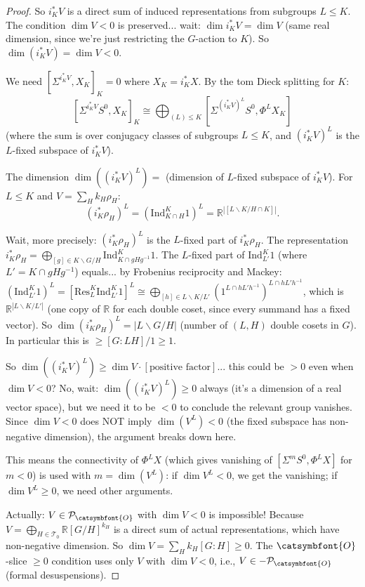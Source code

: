 \documentclass[12pt]{article}
\theoremstyle{definition}
\newcommand{\aO}{{\catsymbfont{O}}}
\begin{document}
\begin{proof}
So $i_K^* V$ is a direct sum of induced representations from subgroups $L\leq K$. The condition $\dim V < 0$ is preserved... wait: $\dim i_K^* V = \dim V$ (same real dimension, since we're just restricting the $G$-action to $K$). So $\dim(i_K^*V) = \dim V < 0$.

We need $[\Sigma^{i_K^*V}, X_K]_K = 0$ where $X_K = i_K^* X$. By the tom Dieck splitting for $K$:
$$[\Sigma^{i_K^*V} S^0, X_K]_K \cong \bigoplus_{(L)\leq K}[\Sigma^{(i_K^*V)^L}S^0, \Phi^L X_K]$$
(where the sum is over conjugacy classes of subgroups $L\leq K$, and $(i_K^*V)^L$ is the $L$-fixed subspace of $i_K^*V$).

The dimension $\dim((i_K^*V)^L) = $ (dimension of $L$-fixed subspace of $i_K^*V$). For $L\leq K$ and $V = \sum_H k_H \rho_H$:
$$(i_K^*\rho_H)^L = (\mathrm{Ind}_{K\cap H}^K 1)^L = \mathbb{R}^{|[L\backslash K/H\cap K]|}.$$

Wait, more precisely: $(i_K^*\rho_H)^L$ is the $L$-fixed part of $i_K^*\rho_H$. The representation $i_K^*\rho_H = \bigoplus_{[g]\in K\backslash G/H}\mathrm{Ind}_{K\cap gHg^{-1}}^K 1$. The $L$-fixed part of $\mathrm{Ind}_{L'}^K 1$ (where $L' = K\cap gHg^{-1}$) equals... by Frobenius reciprocity and Mackey: $(\mathrm{Ind}_{L'}^K 1)^L = [\mathrm{Res}_L^K\mathrm{Ind}_{L'}^K 1]^L \cong \bigoplus_{[h]\in L\backslash K/L'}(1^{L\cap hL'h^{-1}})^{L\cap hL'h^{-1}}$, which is $\mathbb{R}^{|L\backslash K/L'|}$ (one copy of $\mathbb{R}$ for each double coset, since every summand has a fixed vector). So $\dim(i_K^*\rho_H)^L = |L\backslash G/H|$ (number of $(L,H)$ double cosets in $G$). In particular this is $\geq [G:LH]/1 \geq 1$.

So $\dim((i_K^*V)^L)\geq\dim V\cdot [\text{positive factor}]$... this could be $> 0$ even when $\dim V < 0$? No, wait: $\dim((i_K^*V)^L)\geq 0$ always (it's a dimension of a real vector space), but we need it to be $<0$ to conclude the relevant group vanishes. Since $\dim V < 0$ does NOT imply $\dim (V^L) < 0$ (the fixed subspace has non-negative dimension), the argument breaks down here.

This means the connectivity of $\Phi^L X$ (which gives vanishing of $[\Sigma^m S^0, \Phi^L X]$ for $m < 0$) is used with $m = \dim(V^L)$: if $\dim V^L < 0$, we get the vanishing; if $\dim V^L \geq 0$, we need other arguments.

Actually: $V\in\mathcal{P}_\aO$ with $\dim V < 0$ is impossible! Because $V = \bigoplus_{H\in\mathcal{T}_0}\mathbb{R}[G/H]^{k_H}$ is a direct sum of actual representations, which have non-negative dimension. So $\dim V = \sum_H k_H[G:H] \geq 0$. The $\aO$-slice $\geq 0$ condition uses only $V$ with $\dim V < 0$, i.e., $V\in-\mathcal{P}_\aO$ (formal desuspensions).


\end{proof}
\end{document}

